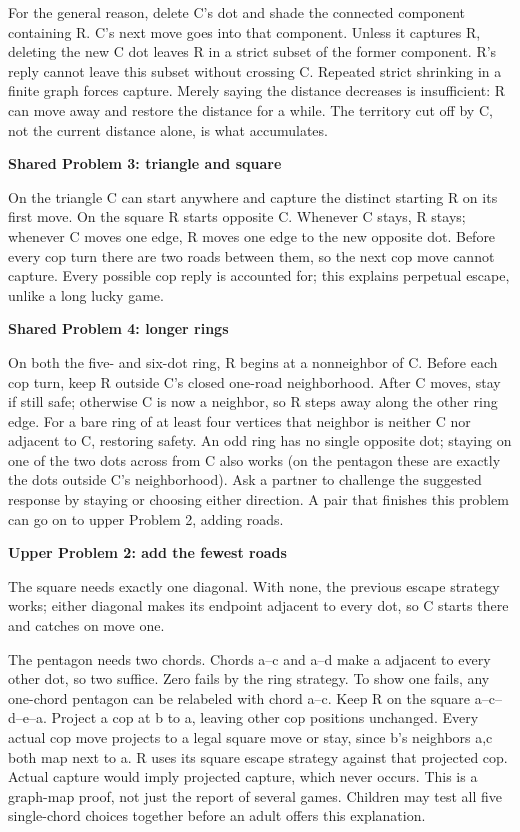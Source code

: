 \documentclass[11pt,letterpaper]{article}
\newcommand{\heading}[1]{\par\vspace{4pt}{\large\bfseries #1}\par}
\newcommand{\sub}[1]{\par\textbf{#1}\par}
\begin{document}
For the general reason, delete C's dot and shade the connected component containing R. C's next move goes into that component. Unless it captures R, deleting the new C dot leaves R in a strict subset of the former component. R's reply cannot leave this subset without crossing C. Repeated strict shrinking in a finite graph forces capture. Merely saying the distance decreases is insufficient: R can move away and restore the distance for a while. The territory cut off by C, not the current distance alone, is what accumulates.

\sub{Shared Problem 3: triangle and square}
On the triangle C can start anywhere and capture the distinct starting R on its first move. On the square R starts opposite C. Whenever C stays, R stays; whenever C moves one edge, R moves one edge to the new opposite dot. Before every cop turn there are two roads between them, so the next cop move cannot capture. Every possible cop reply is accounted for; this explains perpetual escape, unlike a long lucky game.

\sub{Shared Problem 4: longer rings}
On both the five- and six-dot ring, R begins at a nonneighbor of C. Before each cop turn, keep R outside C's closed one-road neighborhood. After C moves, stay if still safe; otherwise C is now a neighbor, so R steps away along the other ring edge. For a bare ring of at least four vertices that neighbor is neither C nor adjacent to C, restoring safety. An odd ring has no single opposite dot; staying on one of the two dots across from C also works (on the pentagon these are exactly the dots outside C's neighborhood). Ask a partner to challenge the suggested response by staying or choosing either direction. A pair that finishes this problem can go on to upper Problem 2, adding roads.
\newpage
\heading{Upper packet: changing the game board}
\sub{Upper Problem 2: add the fewest roads}
The square needs exactly one diagonal. With none, the previous escape strategy works; either diagonal makes its endpoint adjacent to every dot, so C starts there and catches on move one.

The pentagon needs two chords. Chords a--c and a--d make a adjacent to every other dot, so two suffice. Zero fails by the ring strategy. To show one fails, any one-chord pentagon can be relabeled with chord a--c. Keep R on the square a--c--d--e--a. Project a cop at b to a, leaving other cop positions unchanged. Every actual cop move projects to a legal square move or stay, since b's neighbors a,c both map next to a. R uses its square escape strategy against that projected cop. Actual capture would imply projected capture, which never occurs. This is a graph-map proof, not just the report of several games. Children may test all five single-chord choices together before an adult offers this explanation.
\end{document}
